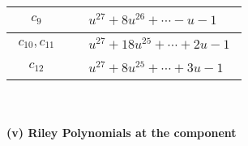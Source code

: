 \documentclass[1p]{elsarticle_modified}
\theoremstyle{definition}
\begin{document}
\begin{tabular}{m{50pt}|m{274pt}}
\hline $$\begin{aligned}c_{9}\end{aligned}$$&$\begin{aligned}
&u^{27}+8 u^{26}+\cdots- u-1
\end{aligned}$\\
\hline $$\begin{aligned}c_{10},c_{11}\end{aligned}$$&$\begin{aligned}
&u^{27}+18 u^{25}+\cdots+2 u-1
\end{aligned}$\\
\hline $$\begin{aligned}c_{12}\end{aligned}$$&$\begin{aligned}
&u^{27}+8 u^{25}+\cdots+3 u-1
\end{aligned}$\\
\hline
\end{tabular}\\~\\
\newpage\renewcommand{\arraystretch}{1}
\flushleft \textbf{(v) Riley Polynomials at the component}\newline \\
\end{document}

